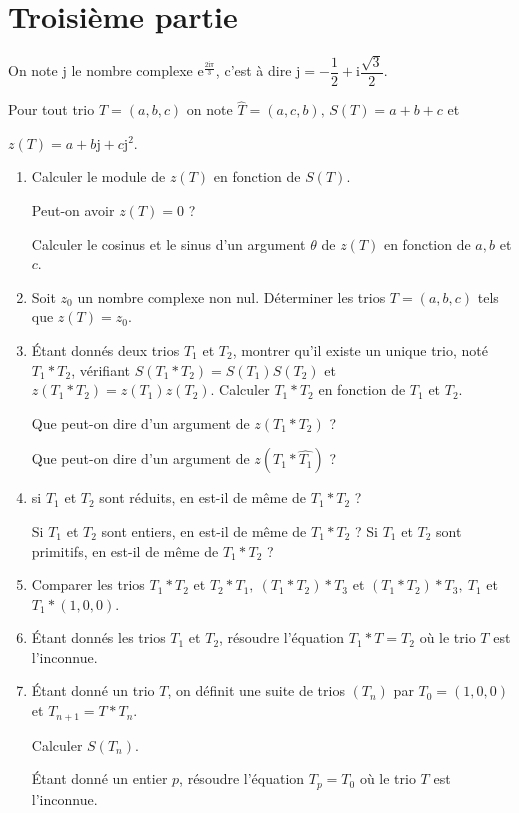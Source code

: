 \newpage

\section*{\color{blue}Troisième partie}

On note j le nombre complexe $\text{e}^{\frac{2\text{i}\pi}{3}}$, c'est à dire j$ = - \dfrac12
+ \text{i}\dfrac{\sqrt 3}{2}$.

Pour tout trio $T = (a, b, c)$ on note $\widehat{T} = (a, c, b),\, S(T) = a + b + c$ et

$z(T) = a + b\text{j} + c\text{j}^2$.

\medskip

\begin{enumerate}
\item Calculer le module de $z(T)$ en fonction de $S(T)$.

Peut-on avoir $z(T) =0$ ?

Calculer le cosinus et le sinus d'un argument $\theta$ de
$z(T)$ en fonction de $a, b$ et $c$.
\item Soit $z_0$ un nombre complexe non nul.  Déterminer les trios
$T=(a, b, c)$ tels que $z(T)=z_0$.
\item Étant donnés deux trios $T_1$ et $T_2$, montrer qu'il existe un
unique trio, noté $T_1*T_2$, vérifiant $S(T_1*T_2) = S(T_1)S(T_2)$ et
$z(T_1*T_2) = z(T_1)z(T_2)$. Calculer $T_1*T_2$ en fonction de $T_1$ et
$T_2$.

Que peut-on dire d'un argument de $z(T_1*T_2)$ ?

Que peut-on dire d'un argument de $z(T_1*\widehat{T_1})$ ?
\item si $T_1$ et $T_2$ sont réduits, en est-il de même de $T_1*T_2$ ?

Si $T_1$ et $T_2$ sont entiers, en est-il de même de $T_1*T_2$ ?  Si $T_1$ et
$T_2$ sont primitifs, en est-il de même de $T_1*T_2$ ?
\item Comparer les trios $T_1*T_2$ et $T_2*T_1,\ (T_1*T_2)*T_3$ et
$(T_1*T_2)*T_3,\ T_1$ et $T_1*(1,0,0)$.
\item Étant donnés les trios $T_1$ et $T_2$, résoudre l'équation
$T_1*T = T_2$ où le trio $T$ est l'inconnue.
\item Étant donné un trio $T$, on définit une suite de trios $(T_n)$ par
$T_0 = (1,0,0)$ et $T_{n+1}=T*T_n$.

Calculer $S(T_n)$.

Étant donné un entier $p$, résoudre l'équation $T_p = T_0$ où le trio $T$ est l'inconnue.
\end{enumerate}

